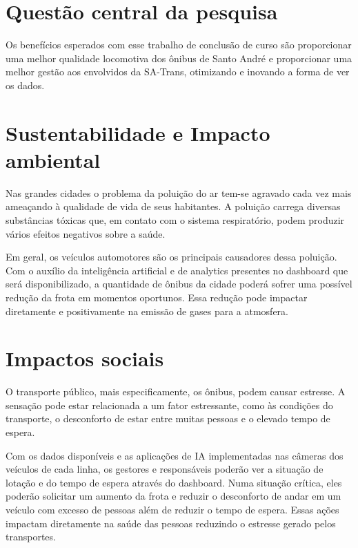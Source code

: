 \section{Questão central da pesquisa}
\indent
\par Os benefícios esperados com esse trabalho de conclusão de curso são proporcionar uma melhor qualidade locomotiva dos ônibus de Santo André e proporcionar uma melhor gestão aos envolvidos da SA-Trans, otimizando e inovando a forma de ver os dados.

\section{Sustentabilidade e Impacto ambiental}
\indent
\par Nas grandes cidades o problema da poluição do ar tem-se agravado cada vez mais ameaçando à qualidade de vida de seus habitantes. A poluição carrega diversas substâncias tóxicas que, em contato com o sistema respiratório, podem produzir vários efeitos negativos sobre a saúde.
\par Em geral, os veículos automotores são os principais causadores dessa poluição. Com o auxílio da inteligência artificial e de analytics presentes no dashboard que será disponibilizado, a quantidade de ônibus da cidade poderá sofrer uma possível redução da frota em momentos oportunos. Essa redução pode impactar diretamente e positivamente na emissão de gases para a atmosfera.

\section{Impactos sociais}
\indent
\par O transporte público, mais especificamente, os ônibus, podem causar estresse. A sensação pode estar relacionada a um fator estressante, como às condições do transporte, o desconforto de estar entre muitas pessoas e o elevado tempo de espera.
\par Com os dados disponíveis e as aplicações de IA implementadas nas câmeras dos veículos de cada linha, os gestores e responsáveis poderão ver a situação de lotação e do tempo de espera através do dashboard. Numa situação crítica, eles poderão solicitar um aumento da frota e reduzir o desconforto de andar em um veículo com excesso de pessoas além de reduzir o tempo de espera. Essas ações impactam diretamente na saúde das pessoas reduzindo o estresse gerado pelos transportes.